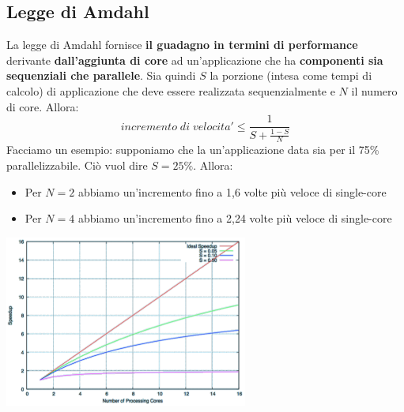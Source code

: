 \documentclass[12pt]{article}
\begin{document}
\subsection{Legge di Amdahl}
La legge di Amdahl fornisce \textbf{il guadagno in termini di performance} derivante \textbf{dall'aggiunta di core} ad un'applicazione che ha \textbf{componenti sia sequenziali che parallele}. Sia quindi $S$ la porzione (intesa come tempi di calcolo) di applicazione che deve essere realizzata sequenzialmente e $N$ il numero di core. Allora:
$$incremento \; di \; velocita' \leq \frac{1}{S + \frac{1-S}{N}}$$
Facciamo un esempio: supponiamo che la un'applicazione data sia per il 75\% parallelizzabile. Ciò vuol dire $S = 25\%$. Allora:
\begin{itemize}
    \item Per $N = 2$ abbiamo un'incremento fino a 1,6 volte più veloce di single-core
    \item Per $N = 4$ abbiamo un'incremento fino a 2,24 volte più veloce di single-core
\end{itemize}
\begin{center}
    \includegraphics[width = 0.60\textwidth]{Images/49.png}
\end{center}
\end{document}
